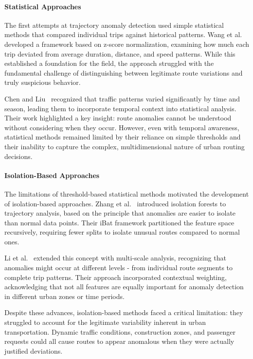 \documentclass[runningheads]{llncs}
\begin{document}
\paragraph{Statistical Approaches}
The first attempts at trajectory anomaly detection used simple statistical methods that compared individual trips against historical patterns. Wang et al.~\cite{wang2020statistical} developed a framework based on z-score normalization, examining how much each trip deviated from average duration, distance, and speed patterns. While this established a foundation for the field, the approach struggled with the fundamental challenge of distinguishing between legitimate route variations and truly suspicious behavior.

Chen and Liu~\cite{chen2021temporal} recognized that traffic patterns varied significantly by time and season, leading them to incorporate temporal context into statistical analysis. Their work highlighted a key insight: route anomalies cannot be understood without considering when they occur. However, even with temporal awareness, statistical methods remained limited by their reliance on simple thresholds and their inability to capture the complex, multidimensional nature of urban routing decisions.

\paragraph{Isolation-Based Approaches}
The limitations of threshold-based statistical methods motivated the development of isolation-based approaches. Zhang et al.~\cite{zhang2019ibat} introduced isolation forests to trajectory analysis, based on the principle that anomalies are easier to isolate than normal data points. Their iBat framework partitioned the feature space recursively, requiring fewer splits to isolate unusual routes compared to normal ones.

Li et al.~\cite{li2022enhanced} extended this concept with multi-scale analysis, recognizing that anomalies might occur at different levels - from individual route segments to complete trip patterns. Their approach incorporated contextual weighting, acknowledging that not all features are equally important for anomaly detection in different urban zones or time periods.

Despite these advances, isolation-based methods faced a critical limitation: they struggled to account for the legitimate variability inherent in urban transportation. Dynamic traffic conditions, construction zones, and passenger requests could all cause routes to appear anomalous when they were actually justified deviations.
\end{document}

